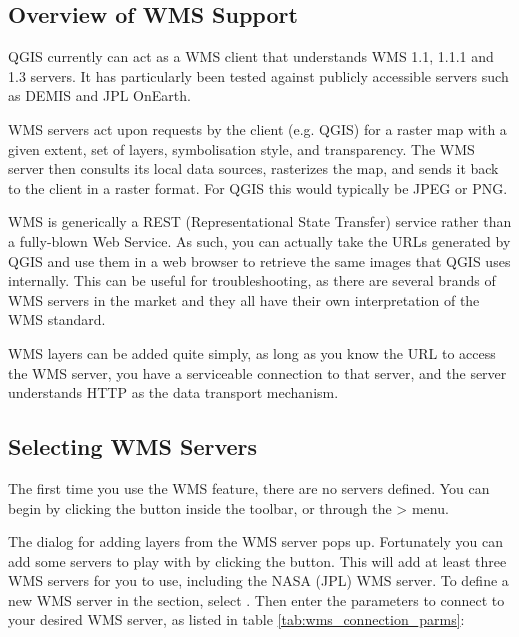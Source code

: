 \subsection{Overview of WMS Support}\label{sec:ogc-wms-about}

QGIS currently can act as a WMS client that understands WMS 1.1, 1.1.1 and 1.3
servers.  It has particularly been tested against publicly accessible servers
such as DEMIS and JPL OnEarth.

WMS servers act upon requests by the client (e.g. QGIS) for a raster map with
a given extent, set of layers, symbolisation style, and transparency.  The WMS
server then consults its local data sources, rasterizes the map, and sends
it back to the client in a raster format.  For QGIS this would typically
be JPEG or PNG.

WMS is generically a REST (Representational State Transfer) service rather than
a fully-blown Web Service.  As such, you can actually take the URLs generated by
QGIS and use them in a web browser to retrieve the same images that QGIS uses
internally.  This can be useful for troubleshooting, as there are
several brands of WMS servers in the market and they all have their own
interpretation of the WMS standard.

WMS layers can be added quite simply, as long as you know the URL to access
the WMS server, you have a serviceable connection to that server, and the
server understands HTTP as the data transport mechanism.

\subsection{Selecting WMS Servers}\label{sec:ogc-wms-servers}

The first time you use the WMS feature, there are no servers defined. You 
can begin by clicking the  button inside the toolbar, 
or through the > menu.

The dialog  for adding layers from the WMS server pops up. Fortunately you can 
add some servers to play with by clicking the  
button. This will add at least three WMS servers for you to use, including the NASA (JPL) 
WMS server. To define a new WMS server in the  section, 
select . Then enter the parameters to connect to your desired
WMS server, as listed in table \ref{tab:wms_connection_parms}:

